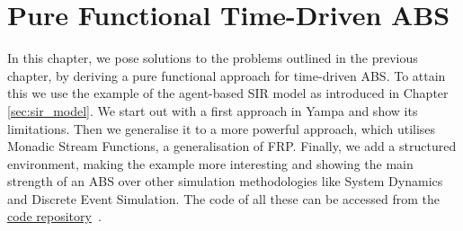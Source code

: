 \chapter{Pure Functional Time-Driven ABS}
\label{ch:timedriven}

In this chapter, we pose solutions to the problems outlined in the previous chapter, by deriving a pure functional approach for time-driven ABS. To attain this we use the example of the agent-based SIR model as introduced in Chapter \ref{sec:sir_model}. We start out with a first approach in Yampa and show its limitations. Then we generalise it to a more powerful approach, which utilises Monadic Stream Functions, a generalisation of FRP. Finally, we add a structured environment, making the example more interesting and showing the main strength of an ABS over other simulation methodologies like System Dynamics and Discrete Event Simulation. The code of all these can be accessed from the \href{https://github.com/thalerjonathan/haskell-sir}{code repository}~\cite{thaler_sir_repository}.







